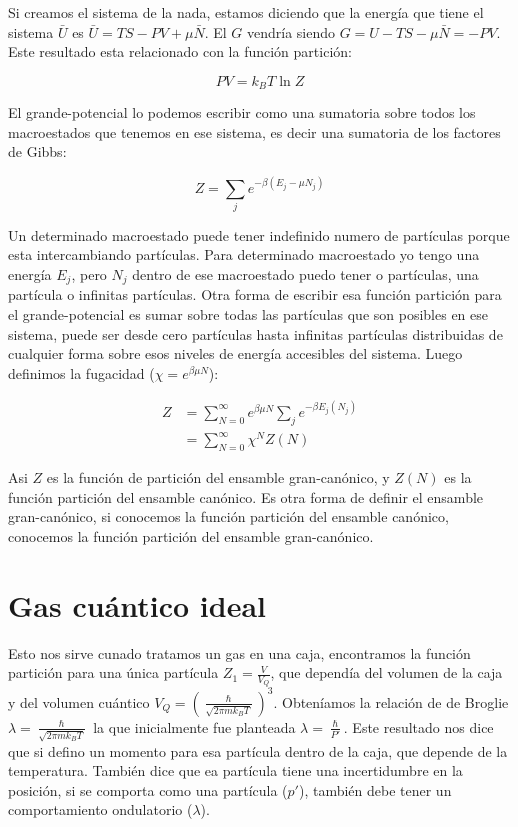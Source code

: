 \documentclass[11pt,fleqn]{book}
\begin{document}
Si creamos el sistema de la nada, estamos diciendo que la energía que tiene el sistema $\bar{U}$ es $\bar{U}=TS-PV+\mu \bar{N}$. El $G$ vendría siendo $G=U-TS-\mu \bar{N}=-PV$. Este resultado esta relacionado con la función partición:

\begin{equation}
    PV=k_{B}T\ln{Z}
    \label{Eq. 5.18}
\end{equation}

El grande-potencial lo podemos escribir como una sumatoria sobre todos los macroestados que tenemos en ese sistema, es decir una sumatoria de los factores de Gibbs:

\begin{equation*}
    Z=\sum_{j} e^{-\beta(E_{j}-\mu N_{j})}
\end{equation*}

Un determinado macroestado puede tener indefinido numero de partículas porque esta intercambiando partículas. Para determinado macroestado yo tengo una energía $E_{j}$, pero $N_{j}$ dentro de ese macroestado puedo tener o partículas, una partícula o infinitas partículas. Otra forma de escribir esa función partición para el grande-potencial es sumar sobre todas las partículas que son posibles en ese sistema, puede ser desde cero partículas hasta infinitas partículas distribuidas de cualquier forma sobre esos niveles de energía accesibles del sistema. Luego definimos la fugacidad ($\chi=e^{\beta\mu N}$):

\begin{equation}
\begin{split}
        Z&=\sum_{N=0}^{\infty}e^{\beta\mu N}\sum_{j}e^{-\beta E_{j}(N_{j})} \\
        &=\sum_{N=0}^{\infty}\chi^{N}Z(N)
\end{split}
\end{equation}

Asi $Z$ es la función de partición del ensamble gran-canónico, y $Z(N)$ es la función partición del ensamble canónico. Es otra forma de definir el  ensamble gran-canónico, si conocemos la función partición del ensamble canónico, conocemos la función partición del ensamble gran-canónico.


\section{Gas cuántico ideal}

Esto nos sirve cunado tratamos un gas en una caja, encontramos la función partición para una única partícula $Z_{1}=\frac{V}{V_{Q}}$, que dependía del volumen de la caja y del volumen cuántico $V_{Q}=\left( \frac{\hslash}{\sqrt{2\pi mk_{B}T}}\right)^{3}$. Obteníamos la relación de de Broglie $\lambda= \frac{\hslash}{\sqrt{2\pi mk_{B}T}}$ la que inicialmente fue planteada $\lambda=\frac{\hslash}{P'}$. Este resultado nos dice que si defino un momento para esa partícula dentro de la caja, que depende de la temperatura. También dice que ea partícula tiene una incertidumbre en la posición, si se comporta como una partícula ($p'$), también debe tener un comportamiento ondulatorio ($\lambda$).
\end{document}
